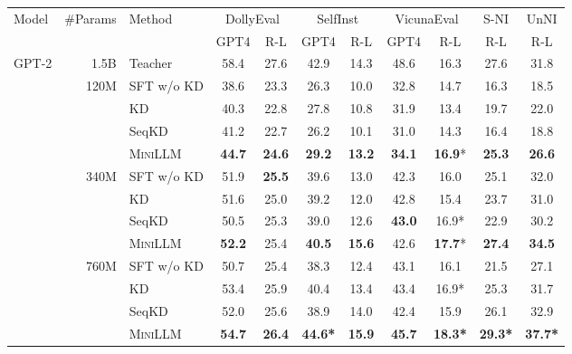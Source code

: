\documentclass{article}
\begin{document}
\begin{table}[t]
    \centering
    \small
    \begin{tabular}{lrl|cc|cc|cc|c|c}
    \toprule
    \multirow{2}{*}{Model} & \multirow{2}{*}{\#Params} & \multirow{2}{*}{Method}
    & \multicolumn{2}{c|}{DollyEval} & \multicolumn{2}{c|}{SelfInst} & \multicolumn{2}{c|}{VicunaEval} & S-NI & UnNI\\
     & & & GPT4 & R-L & GPT4 & R-L  & GPT4 & R-L & R-L & R-L \\ \midrule
     \multirow{13}{*}{GPT-2} 
     \color{gray} & 1.5B & Teacher &  58.4  &  27.6 &  42.9 &   14.3 &  48.6 & 16.3 & 27.6 & 31.8    \\ \cmidrule(l){2-11}
     & \multirow{4}{*}{120M} 
        & SFT w/o KD     &  38.6  &  23.3 &  26.3 &   10.0 &  32.8 & 14.7 & 16.3 & 18.5     \\
     &  & KD &  40.3  &  22.8 &  27.8 &   10.8 &  31.9 & 13.4 & 19.7 & 22.0     \\
     &  & SeqKD  &  41.2  &  22.7 &  26.2 &   10.1 &  31.0 & 14.3 & 16.4 & 18.8     \\
     &  & \textsc{MiniLLM}  &  \textbf{44.7}  &  \textbf{24.6} &  \textbf{29.2} &   \textbf{13.2} &  \textbf{34.1} & \textbf{16.9}* & \textbf{25.3} & \textbf{26.6}     \\ \cmidrule(l){2-11}
     & \multirow{4}{*}{340M} 
        & SFT w/o KD     &  51.9  &  \textbf{25.5}&  39.6  &  13.0         &  42.3       & 16.0    &  25.1 & 32.0    \\
     &  & KD &  51.6  &  25.0 &  39.2 &  12.0  &  42.8       & 15.4    &  23.7 & 31.0  \\
     &  & SeqKD  &  50.5  &  25.3 &  39.0 &  12.6  &  \textbf{43.0} & 16.9* & 22.9 & 30.2     \\
     &  & \textsc{MiniLLM}  &  \textbf{52.2}  &  25.4        &  \textbf{40.5}       &  \textbf{15.6}         &  42.6       & \textbf{17.7}*    &  \textbf{27.4} & \textbf{34.5}  \\ \cmidrule(l){2-11}
     & \multirow{4}{*}{760M} 
        & SFT w/o KD     &  50.7  &  25.4 &  38.3 &   12.4 &  43.1 & 16.1 & 21.5 & 27.1   \\ 
     &  & KD &  53.4  &  25.9 &  40.4 &   13.4 &  43.4 & 16.9* & 25.3 & 31.7   \\
     &  & SeqKD  &  52.0  &  25.6 &  38.9 &   14.0 &  42.4 & 15.9 & 26.1 & 32.9    \\
     &  & \textsc{MiniLLM}  &  \textbf{54.7}  &  \textbf{26.4} &  \textbf{44.6*} &   \textbf{15.9} &  \textbf{45.7} & \textbf{18.3*} & \textbf{29.3*} & \textbf{37.7*}    \\ \midrule

\end{tabular}
\end{table}
\end{document}
